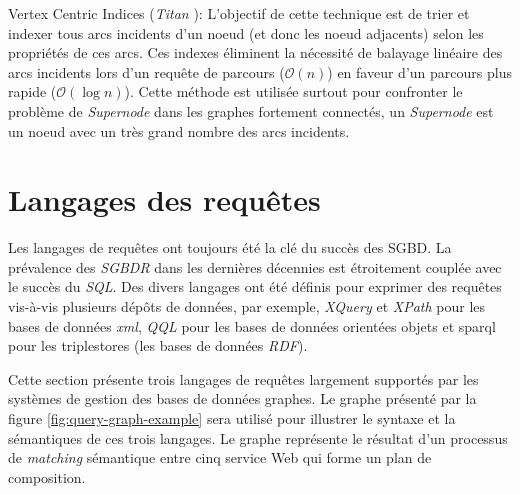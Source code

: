     Vertex Centric Indices (\emph{Titan} \cite{vertexci}): L'objectif
    de cette technique est de trier et indexer tous arcs incidents
    d'un noeud (et donc les noeud adjacents) selon les propriétés de
    ces arcs. Ces indexes éliminent la nécessité de balayage linéaire
    des arcs incidents lors d'un requête de parcours
    ($\mathcal{O}(n)$) en faveur d'un parcours plus rapide
    ($\mathcal{O}(\log{}n)$). Cette méthode est utilisée surtout pour
    confronter le problème de \emph{Supernode} dans les graphes
    fortement connectés, un \emph{Supernode} est un noeud avec un très
    grand nombre des arcs incidents.



\section{Langages des requêtes}
\label{sec:query-languages}
Les langages de requêtes ont toujours été la clé du succès des
\acrshort{SGBD}. La prévalence des \emph{\acrshort{SGBDR}} dans les
dernières décennies est étroitement couplée avec le succès du
\emph{SQL}. Des divers langages ont été définis pour exprimer des
requêtes vis-à-vis plusieurs dépôts de données, par exemple,
\emph{XQuery} \cite{boag2002xquery} et \emph{XPath}
\cite{clark1999xml} pour les bases de données \emph{\acrshort{xml}},
\emph{QQL} \cite{alashqur1989oql} pour les bases de données orientées
objets et \acrshort{sparql} \cite{prud2008sparql} pour les
triplestores (les bases de données \emph{RDF}).



Cette section présente trois langages de requêtes largement supportés
par les systèmes de gestion des bases de données graphes. Le graphe
présenté par la figure \ref{fig:query-graph-example} sera utilisé pour
illustrer le syntaxe et la sémantiques de ces trois langages. Le
graphe représente le résultat d'un processus de \emph{matching}
sémantique entre cinq service Web qui forme un plan de composition.

